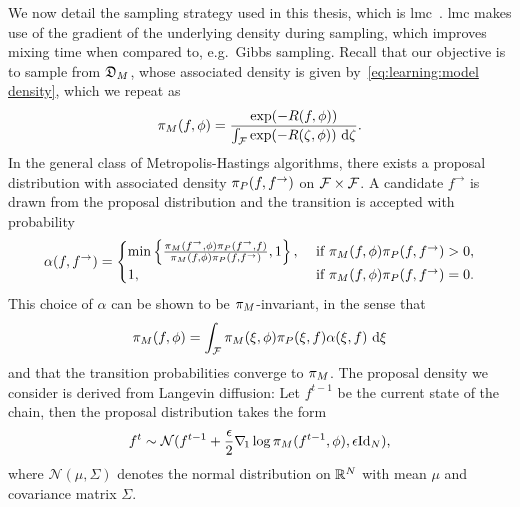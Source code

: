 \documentclass[../ml-ct.tex]{subfiles}
\begin{document}
We now detail the sampling strategy used in this thesis, which is \gls{lmc}~\cite{grenader_representations_1994,nijkamp_shortrun_2019,roberts_exponential_1996,rossky_brownian_1978}.
\gls{lmc} makes use of the gradient of the underlying density during sampling, which improves mixing time when compared to, e.g.\ Gibbs sampling.
Recall that our objective is to sample from \( \mathfrak{D}_{M} \), whose associated density is given by~\cref{eq:learning:model density}, which we repeat as
\begin{equation}
	\pi_{M}(f, \phi) = \frac{\exp(-R(f, \phi))}{\int_{\mathcal{F}} \exp(-R(\zeta, \phi))\ \mathrm{d} \zeta}.\nonumber
\end{equation}
In the general class of Metropolis-Hastings algorithms, there exists a proposal distribution with associated density \( \pi_{P}(f, f^{\rightarrow}) \) on \( \mathcal{F} \times \mathcal{F} \).
A candidate \( f^{\rightarrow} \) is drawn from the proposal distribution and the transition is accepted with probability
\begin{equation}
	\alpha(f, f^{\rightarrow}) = \begin{cases}
		\min\left\{ \frac{\pdf{M}(f^{\rightarrow}, \params)\pdf{P}(f^\rightarrow, f)}{\pdf{M}(f, \params)\pdf{P}(f, f^\rightarrow)}, 1\right\}, &\ \text{if}\ \pdf{M}(f, \params) \pdf{P}(f, f^{\rightarrow}) > 0, \\
		1, &\ \text{if}\ \pdf{M}(f, \params) \pdf{P}(f, f^{\rightarrow}) = 0.
	\end{cases}%
	\label{eq:learning:metropolis hastings step}
\end{equation}
This choice of \( \alpha \) can be shown to be \( \pi_{M} \)-invariant, in the sense that
\begin{equation}
	\pi_{M}(f, \phi) = \int_{\mathcal{F}} \pi_{M}(\xi, \phi) \pi_{P}(\xi, f) \alpha(\xi, f)\ \mathrm{d} \xi
\end{equation}
and that the transition probabilities converge to \( \pi_{M} \).
The proposal density we consider is derived from Langevin diffusion:
Let \( f^{t - 1} \) be the current state of the chain, then the proposal distribution takes the form
\begin{equation}
	f^t \sim \mathcal{N}(f^{t - 1} + \frac{\epsilon}{2}\grad{1} \log \pdf{M}(f^{t - 1}, \params), \epsilon\Id{N}),%
	\label{eq:learning:langevin proposal}
\end{equation}
where \( \mathcal{N}(\mu, \Sigma) \) denotes the normal distribution on \( \mathbb{R}^N \) with mean \( \mu \) and covariance matrix \( \Sigma \).
\end{document}
